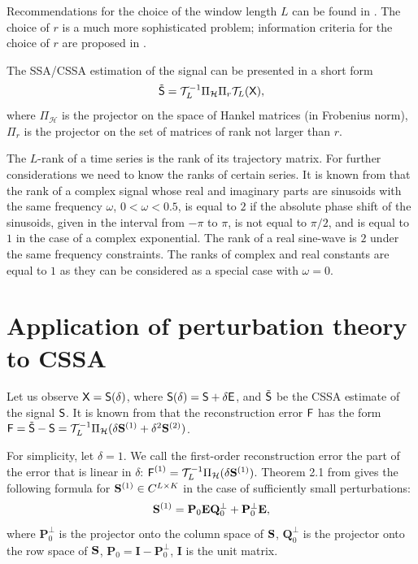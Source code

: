 \documentclass[engproc, submit, article,pdftex,moreauthors]{Definitions/mdpi}
\begin{document}
Recommendations for the choice of the window length $L$ can be found in \cite{Golyandina.etal2018,Golyandina2010}. The choice of $r$ is a much more sophisticated problem; information criteria for the choice of $r$ are proposed in \cite{Golyandina.Zvonarev2024}.

The SSA/CSSA estimation of the signal can be presented in a short form
	\begin{equation*}
		\tilde{\textsf{S}} = \mathcal{T}^{-1}_{L} \Pi_{\mathcal{H}} \Pi_{r} \mathcal{T}_L (\textsf{X}),
	\end{equation*}
where $\Pi_{\mathcal{H}}$ is the projector on the space of Hankel matrices (in Frobenius norm), $\Pi_{r}$ is the projector on the set of matrices of rank not larger than $r$.

The $L$-rank of a time series is the rank of its trajectory matrix. For further considerations we need to know the ranks of certain series.
It is known from \cite{Golyandina.etal2013} that the rank of a complex signal whose real and imaginary parts are sinusoids with the same frequency $\omega$, $0<\omega<0.5$, is equal to $2$ if the absolute phase shift of the sinusoids, given in the interval from $-\pi$ to $\pi$, is not equal to $\pi/2$, and is equal to $1$ in the case of a complex exponential. The rank of a real sine-wave is $2$ under the same frequency constraints. The ranks of complex and real constants are equal to $1$ as they can be considered as a special case with $\omega = 0$.

\section{Application of perturbation theory to CSSA}

Let us observe $\textsf{X} = \textsf{S}(\delta)$, where $\textsf{S}(\delta) = \textsf{S} + \delta \textsf{E}$, and $\tilde{\textsf{S}}$ be the CSSA estimate of the signal $\textsf{S}$.
It is known from \cite{Nekrutkin} that
the reconstruction error $\textsf{F}$ has the form $\textsf{F} = \tilde{\textsf{S}} - \textsf{S} = \mathcal{T}_L^{-1} \Pi_{\mathcal{H}} (\delta\mathbf{S}^{(1)} + \delta^2\mathbf{S}^{(2)})$.

For simplicity, let $\delta = 1$. We call the first-order reconstruction error the part of the error that is linear in $\delta$: $\textsf{F}^{(1)} = \mathcal{T}_L^{-1} \Pi_{\mathcal{H}} (\delta\mathbf{S}^{(1)})$.
Theorem 2.1 from \cite{Nekrutkin} gives the following formula for $\mathbf{S}^{(1)}\in \space
C^{L\times K}$ in the case of sufficiently small perturbations:
\begin{equation} \label{eq:main}
	\mathbf{S}^{(1)} = \mathbf{P}_0 \mathbf{E} \mathbf{Q}^{\perp}_0 + \mathbf{P}^{\perp}_0 \mathbf{E},
\end{equation}
where $\mathbf{P}^{\perp}_0$ is the projector onto the column space of $\mathbf{S}$, $\mathbf{Q}^{\perp}_0$ is the projector onto the row space of $\mathbf{S}$, $\mathbf{P}_0 = \mathbf{I} - \mathbf{P}^{\perp}_0$, $\mathbf{I}$ is the unit matrix.
\end{document}
